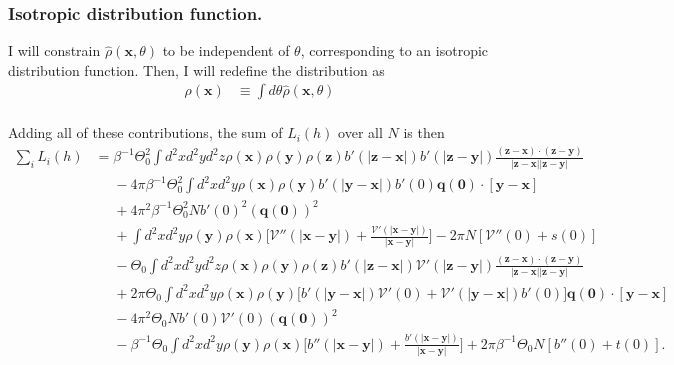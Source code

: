 \documentclass{article}
\begin{document}
\subsubsection{Isotropic distribution function.}

I will constrain $\hat{\rho}(\bm{x},\theta)$ to be independent of $\theta$, corresponding to
an isotropic distribution function. Then, I will redefine the distribution as
\begin{align}
  \rho(\bm{x})&\equiv\int d\theta\hat{\rho}(\bm{x},\theta)\nonumber\\
\end{align}

Adding all of these contributions, the sum of $L_i(h)$ over all $N$ is then
\begin{align}
  \sum_i L_i(h)
  &=\beta^{-1}\Theta_0^2\int d^2xd^2yd^2z\rho(\bm{x})\rho(\bm{y})
    \rho(\bm{z})b'(|\bm{z}-\bm{x}|)b'(|\bm{z}-\bm{y}|)
    \frac{(\bm{z}-\bm{x})\cdot(\bm{z}-\bm{y})}{|\bm{z}-\bm{x}||\bm{z}-\bm{y}|}\nonumber\\
  &\phantom{=}-4\pi\beta^{-1}\Theta_0^2\int d^2xd^2y\rho(\bm{x})\rho(\bm{y})
    b'(|\bm{y}-\bm{x}|)b'(0)\bm{q}(\bm{0})\cdot[\bm{y}-\bm{x}]\nonumber\\
  &\phantom{=}+4\pi^2\beta^{-1}\Theta_0^2Nb'(0)^2(\bm{q}(\bm{0}))^2\nonumber\\
  &\phantom{=}+\int d^2xd^2y\rho(\bm{y})\rho(\bm{x})
    \bigg[\mathcal{V}''(|\bm{x}-\bm{y}|)
    +\frac{\mathcal{V}'(|\bm{x}-\bm{y}|)}{|\bm{x}-\bm{y}|}\bigg]
    -2\pi N[\mathcal{V}''(0)+s(0)]\nonumber\\
  &\phantom{=}
    -\Theta_0\int d^2xd^2yd^2z\rho(\bm{x})\rho(\bm{y})
    \rho(\bm{z})b'(|\bm{z}-\bm{x}|)\mathcal{V}'(|\bm{z}-\bm{y}|)
    \frac{(\bm{z}-\bm{x})\cdot(\bm{z}-\bm{y})}{|\bm{z}-\bm{x}||\bm{z}-\bm{y}|}\nonumber\\
  &\phantom{=}+2\pi\Theta_0\int d^2xd^2y\rho(\bm{x})\rho(\bm{y})
    \bigg[b'(|\bm{y}-\bm{x}|)\mathcal{V}'(0)+\mathcal{V}'(|\bm{y}-\bm{x}|)b'(0)\bigg]
    \bm{q}(\bm{0})\cdot[\bm{y}-\bm{x}]\nonumber\\
  &\phantom{=}-4\pi^2\Theta_0Nb'(0)\mathcal{V}'(0)(\bm{q}(\bm{0}))^2\nonumber\\
  &\phantom{=}-\beta^{-1}\Theta_0\int d^2xd^2y\rho(\bm{y})\rho(\bm{x})
    \bigg[b''(|\bm{x}-\bm{y}|)
    +\frac{b'(|\bm{x}-\bm{y}|)}{|\bm{x}-\bm{y}|}\bigg]
    +2\pi\beta^{-1}\Theta_0 N[b''(0)+t(0)].
\end{align}
\end{document}
